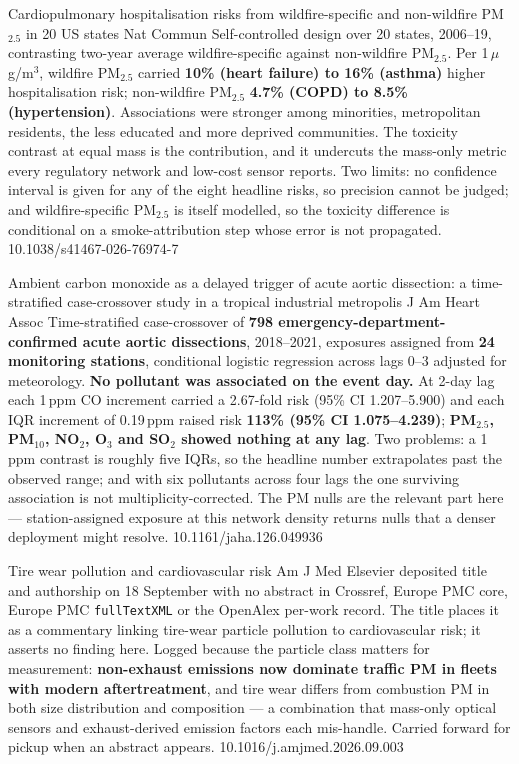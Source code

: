 \documentclass[10pt]{article}
\begin{document}

{Cardiopulmonary hospitalisation risks from wildfire-specific and non-wildfire
PM$_{2.5}$ in 20 US states}
{Nat Commun}
{Self-controlled design over 20 states, 2006--19, contrasting two-year average
wildfire-specific against non-wildfire PM$_{2.5}$. Per 1\,$\mu$g/m$^3$, wildfire
PM$_{2.5}$ carried \textbf{10\% (heart failure) to 16\% (asthma)} higher hospitalisation
risk; non-wildfire PM$_{2.5}$ \textbf{4.7\% (COPD) to 8.5\% (hypertension)}. Associations
were stronger among minorities, metropolitan residents, the less educated and more
deprived communities. The toxicity contrast at equal mass is the contribution, and it
undercuts the mass-only metric every regulatory network and low-cost sensor reports. Two
limits: no confidence interval is given for any of the eight headline risks, so precision
cannot be judged; and wildfire-specific PM$_{2.5}$ is itself modelled, so the toxicity
difference is conditional on a smoke-attribution step whose error is not propagated.}
{10.1038/s41467-026-76974-7}

{Ambient carbon monoxide as a delayed trigger of acute aortic dissection: a time-stratified
case-crossover study in a tropical industrial metropolis}
{J Am Heart Assoc}
{Time-stratified case-crossover of \textbf{798 emergency-department-confirmed acute aortic
dissections}, 2018--2021, exposures assigned from \textbf{24 monitoring stations},
conditional logistic regression across lags 0--3 adjusted for meteorology. \textbf{No
pollutant was associated on the event day.} At 2-day lag each 1\,ppm CO increment carried a
2.67-fold risk (95\% CI 1.207--5.900) and each IQR increment of 0.19\,ppm raised risk
\textbf{113\% (95\% CI 1.075--4.239)}; \textbf{PM$_{2.5}$, PM$_{10}$, NO$_2$, O$_3$ and
SO$_2$ showed nothing at any lag}. Two problems: a 1\,ppm contrast is roughly five IQRs, so
the headline number extrapolates past the observed range; and with six pollutants across
four lags the one surviving association is not multiplicity-corrected. The PM nulls are
the relevant part here --- station-assigned exposure at this network density returns
nulls that a denser deployment might resolve.}
{10.1161/jaha.126.049936}

{Tire wear pollution and cardiovascular risk}
{Am J Med}
{Elsevier deposited title and authorship on 18 September with no abstract in Crossref,
Europe PMC core, Europe PMC \texttt{fullTextXML} or the OpenAlex per-work record. The title
places it as a commentary linking tire-wear particle pollution to cardiovascular risk; it
asserts no finding here. Logged because the particle class matters for measurement:
\textbf{non-exhaust emissions now dominate traffic PM in fleets with modern
aftertreatment}, and tire wear differs from combustion PM in both size distribution and
composition --- a combination that mass-only optical sensors and exhaust-derived emission
factors each mis-handle. Carried forward for pickup when an abstract appears.}
{10.1016/j.amjmed.2026.09.003}
\end{document}
